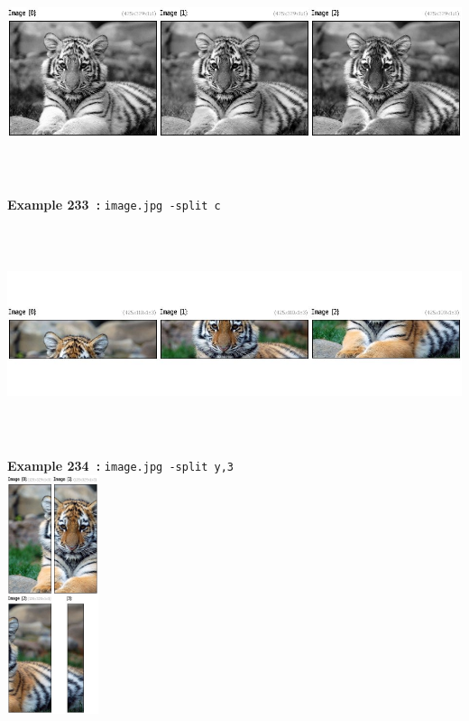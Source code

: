 \documentclass[a4paper,11pt,twoside]{book}
\begin{document}
\begin{center}\includegraphics[keepaspectratio=true,height=7cm,width=\textwidth]{img/gmic_def233.jpg}\\
{\footnotesize \textbf{Example 233~:} \texttt{image.jpg -split c}}
\\\includegraphics[keepaspectratio=true,height=7cm,width=\textwidth]{img/gmic_def234.jpg}\\
{\footnotesize \textbf{Example 234~:} \texttt{image.jpg -split y,3}}
\\\includegraphics[keepaspectratio=true,height=7cm,width=\textwidth]{img/gmic_def235.jpg}\\

\end{center}
\end{document}

